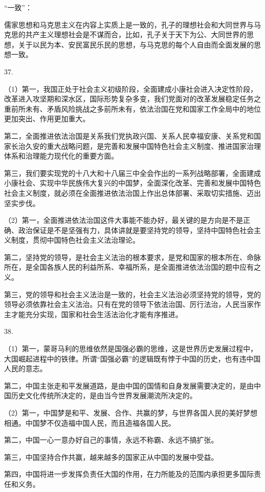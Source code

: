 \documentclass[a4paper]{article}
\begin{document}
“一致”：

儒家思想和马克思主义在内容上实质上是一致的，孔子的理想社会和大同世界与马克思的共产主义理想社会是不谋而合，比如，孔子关于天下为公、大同世界的思想，关于以民为本、安民富民乐民的思想，与马克思的每个人自由而全面发展的思想一致。

37.

（1）第一，我国正处于社会主义初级阶段，全面建成小康社会进入决定性阶段，改革进入攻坚期和深水区，国际形势复杂多变，我们党面对的改革发展稳定任务之重前所未有、矛盾风险挑战之多前所未有，依法治国在党和国家工作全局中的地位更加突出、作用更加重大。

第二，全面推进依法治国是关系我们党执政兴国、关系人民幸福安康、关系党和国家长治久安的重大战略问题，是完善和发展中国特色社会主义制度、推进国家治理体系和治理能力现代化的重要方面。

第三，我们要实现党的十八大和十八届三中全会作出的一系列战略部署，全面建成小康社会、实现中华民族伟大复兴的中国梦，全面深化改革、完善和发展中国特色社会主义制度，就必须在全面推进依法治国上作出总体部署、采取切实措施、迈出坚实步伐。

（2）第一，全面推进依法治国这件大事能不能办好，最关键的是方向是不是正确、政治保证是不是坚强有力，具体讲就是要坚持党的领导，坚持中国特色社会主义制度，贯彻中国特色社会主义法治理论。

第二，坚持党的领导，是社会主义法治的根本要求，是党和国家的根本所在、命脉所在，是全国各族人民的利益所系、幸福所系，是全面推进依法治国的题中应有之义。

第三，党的领导和社会主义法治是一致的，社会主义法治必须坚持党的领导，党的领导必须依靠社会主义法治。只有在党的领导下依法治国、厉行法治，人民当家作主才能充分实现，国家和社会生活法治化才能有序推进。

38.

（1）第一，蒙哥马利的思维依然是国强必霸的思维，这是世界历史发展过程中，大国崛起进程中的铁律。所谓“国强必霸”的逻辑既有悖于中国的历史，也有违中国人民的意志。

第二，中国主张走和平发展道路，是由中国的国情和自身发展需要决定的，是由中国历史文化传统所决定的，是由当今世界发展潮流所决定的。

（2）第一，中国梦是和平、发展、合作、共赢的梦，与世界各国人民的美好梦想相通。中国梦不仅造福中国人民，而且造福各国人民。

第二，中国一心一意办好自己的事情，永远不称霸、永远不搞扩张。

第三，中国坚持合作共赢，越来越多的国家正从中国的发展中受益。

第四，中国将进一步发挥负责任大国的作用，在力所能及的范围内承担更多国际责任和义务。
\end{document}
